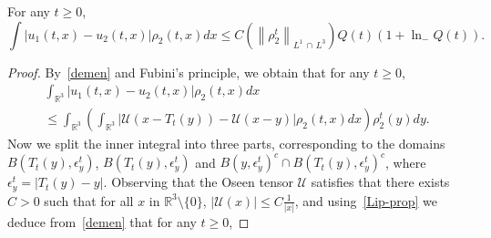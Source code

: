 \documentclass[AHL,Unicode,longabstracts,published]{cedram}
\newcommand{\R}{\mathbb{R}}
\newcommand{\clU}{\mathcal{U}}
\renewcommand{\leq}{\leqslant}
\renewcommand{\geq}{\geqslant}
\begin{document}
\begin{lemm}\label{LLint}
For any $t\geq 0$,
\begin{equation}\label{esti-LLint}
\int\big|u_1(t,x)-u_2(t,x)\big|\rho_2(t,x)dx \leq C\left(\left\|\rho_2^t\right\|_{L^1\,\cap\,L^3}\right) Q(t) (1+\ln_{-} Q(t)).
\end{equation}
\end{lemm}
\begin{proof}
By~\eqref{demen} and Fubini's principle, we obtain that for any $t\geq 0$,
\begin{multline*}
\int_{\R^3}|u_1(t,x)-u_2(t,x)|\rho_2(t,x)dx \\ \leq \int_{\R^3}\left(\int_{\R^3} |\clU(x-T_t (y))-\clU(x-y)| \rho_2(t,x) dx \right) \rho_2^t(y) dy.
\end{multline*}
Now we split the inner integral into three parts, corresponding to the domains $B(T_t (y),\epsilon_y^t)$, $B(T_t (y),\epsilon_y^t)$ and $B(y,\epsilon_y^t)^c \cap B(T_t (y),\epsilon_y^t)^c$, where $\epsilon_y^t =|T_t (y) - y|$. Observing that the Oseen tensor $\clU$ satisfies that there exists $C>0$ such that for all $x $ in $\R^3 \setminus \{ 0\}$, $ \left|\clU(x) \right|\leq C\frac{1}{|x|} $, and using~\eqref{Lip-prop} we deduce from~\eqref{demen} that for any $t\geq 0$,


\end{proof}
\end{document}
